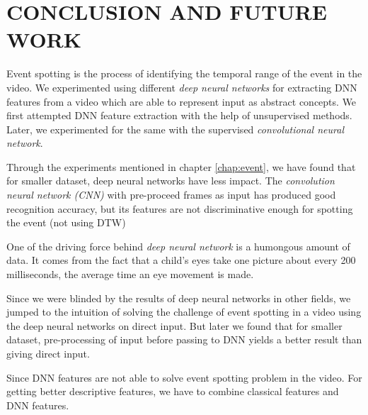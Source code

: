 \chapter{CONCLUSION AND FUTURE WORK} 
\label{chap:concl}
Event spotting is the process of identifying the temporal range of the event in the video.  We experimented using  different \textit{deep neural networks} for extracting DNN features from a video which are able to represent input as abstract concepts.  We first attempted  DNN feature extraction with the help of unsupervised methods.  Later, we experimented for the same with the supervised \textit{convolutional neural network}.

Through the experiments mentioned in chapter \ref{chap:event}, we have found that for smaller dataset, deep neural networks have less impact.  The \textit{convolution neural network (CNN)} with pre-proceed frames as input has produced good recognition accuracy, but its features are not discriminative enough for spotting the event (not using DTW)

One of the driving force behind \textit{deep neural network} is a humongous amount of data.  It comes from the fact that a child's eyes take one picture about every 200 milliseconds, the average time an eye movement is made. 

Since we were blinded by the results of deep neural networks in other fields, we jumped to the intuition of solving the challenge of event spotting in a video using the deep neural networks on direct input.  But later we found that for smaller dataset, pre-processing of input before passing to DNN yields a better result than giving direct input.

Since DNN features are not able to solve event spotting problem in the video.  For getting better descriptive features, we have to combine classical features and DNN features.  


